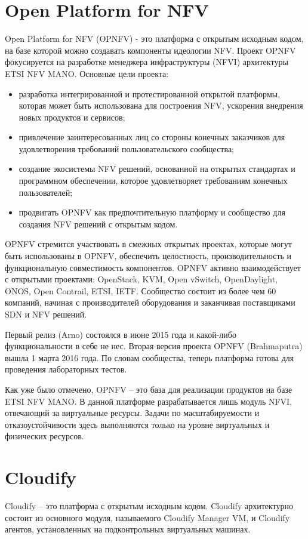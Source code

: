 \documentclass[oneside,final,14pt,a4paper]{extreport}
\begin{document}
\section{Open Platform for NFV}
Open Platform for NFV (OPNFV) - это платформа с открытым исходным кодом, на базе которой можно создавать компоненты  идеологии NFV. Проект OPNFV фокусируется на разработке менеджера инфраструктуры (NFVI) архитектуры ETSI NFV MANO\cite{opnfv-official}. Основные цели проекта:
\begin{itemize}
	\item разработка интегрированной и протестированной открытой платформы, которая может быть использована для построения NFV, ускорения внедрения новых продуктов и сервисов;
	\item привлечение заинтересованных лиц со стороны конечных заказчиков для удовлетворения требований пользовательского сообщества;
	\item создание экосистемы NFV решений, основанной на открытых стандартах и программном обеспечении, которое удовлетворяет требованиям конечных пользователей;
	\item продвигать OPNFV как предпочтительную платформу и сообщество для создания NFV решений с открытым кодом.
\end{itemize}

OPNFV стремится участвовать в смежных открытых проектах, которые могут быть использованы в OPNFV, обеспечить целостность, производительность и функциональную совместимость компонентов. OPNFV активно взаимодействует с открытыми проектами: OpenStack, KVM, Open vSwitch, OpenDaylight, ONOS, Open Contrail, ETSI, IETF. Сообщество состоит из более чем 60 компаний, начиная с производителей оборудования и заканчивая поставщиками SDN и NFV решений.\cite{opnfv-state1}

Первый релиз (Arno) состоялся в июне 2015 года и какой-либо функциональности в себе не нес. Вторая версия проекта OPNFV (Brahmaputra) вышла 1 марта 2016 года. По словам сообщества, теперь платформа готова для проведения лабораторных тестов.

Как уже было отмечено, OPNFV -- это база для реализации продуктов на базе ETSI NFV MANO. В данной платформе разрабатывается лишь модуль NFVI, отвечающий за виртуальные ресурсы. Задачи по масштабируемости и отказоустойчивости здесь выполняются только на уровне виртуальных и физических ресурсов.


\section{Cloudify}
Cloudify -- это платформа с открытым исходным кодом. Cloudify архитектурно состоит из основного модуля, называемого Cloudify Manager VM, и Cloudify агентов, установленных на подконтрольных виртуальных машинах. 
\end{document}

